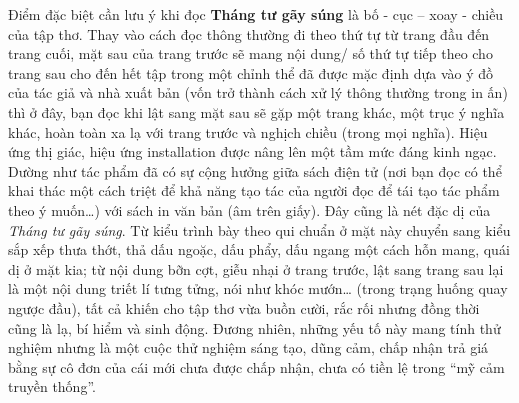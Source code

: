 \documentclass[../main.tex]{subfiles}
\begin{document}
\begin{multicols}{2}
\begin{blockquote}
Điểm đặc biệt cần lưu ý khi đọc \textbf{Tháng tư gãy súng} là bố - cục – xoay - chiều của tập thơ. Thay vào cách đọc thông thường đi theo thứ tự từ trang đầu đến trang cuối, mặt sau của trang trước sẽ mang nội dung/ số thứ tự tiếp theo cho trang sau cho đến hết tập trong một chỉnh thể đã được mặc định dựa vào ý đồ của tác giả và nhà xuất bản (vốn trở thành cách xử lý thông thường trong in ấn) thì ở đây, bạn đọc khi lật sang mặt sau sẽ gặp một trang khác, một trục ý nghĩa khác, hoàn toàn xa lạ với trang trước và nghịch chiều (trong mọi nghĩa). Hiệu ứng thị giác, hiệu ứng installation được nâng lên một tầm mức đáng kinh ngạc. Dường như tác phẩm đã có sự cộng hưởng giữa sách điện tử (nơi bạn đọc có thể khai thác một cách triệt để khả năng tạo tác của người đọc để tái tạo tác phẩm theo ý muốn…) với sách in văn bản (âm trên giấy). Đây cũng là nét đặc dị của \textit{Tháng tư gãy súng}. Từ kiểu trình bày theo qui chuẩn ở mặt này chuyển sang kiểu sắp xếp thưa thớt, thả dấu ngoặc, dấu phẩy, dấu ngang một cách hỗn mang, quái dị ở mặt kia; từ nội dung bỡn cợt, giễu nhại ở trang trước, lật sang trang sau lại là một nội dung triết lí tưng tửng, nói như khóc mướn… (trong trạng huống quay ngược đầu), tất cả khiến cho tập thơ vừa buồn cười, rắc rối nhưng đồng thời cũng là lạ, bí hiểm và sinh động. Đương nhiên, những yếu tố này mang tính thử nghiệm nhưng là một cuộc thử nghiệm sáng tạo, dũng cảm, chấp nhận trả giá bằng sự cô đơn của cái mới chưa được chấp nhận, chưa có tiền lệ trong “mỹ cảm truyền thống”. 
\end{blockquote}
\end{multicols}
\end{document}
